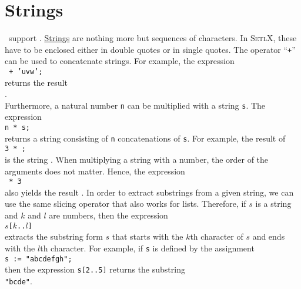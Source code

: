 \section{Strings}
\setlx\ support .  \href{https://en.wikipedia.org/wiki/String_(computer_science)}{Strings} are
nothing more but sequences of characters.  In \textsc{SetlX}, these have to be 
enclosed either in double quotes or in single quotes.  The operator ``\texttt{+}'' can be used to concatenate
strings.  For example, the expression 
\\[0.2cm]
\hspace*{1.3cm}
\texttt{ + \texttt{'uvw'};}
\\[0.2cm]
returns the result
\\[0.2cm]
\hspace*{1.3cm}
.
\\[0.2cm]
Furthermore, a natural number \texttt{n} can be multiplied with a string \texttt{s}.  The expression
\\[0.2cm]
\hspace*{1.3cm}
\texttt{n * s;}
\\[0.2cm]
returns a string consisting of \texttt{n} concatenations of \texttt{s}.  For example,
the result of
\\[0.2cm]
\hspace*{1.3cm}
\texttt{3 * ;}
\\[0.2cm]
is the string .  When multiplying a string with a number, the order of the
arguments does not matter. Hence, the expression
\\[0.2cm]
\hspace*{1.3cm}
\texttt{ * 3}
\\[0.2cm]
also yields the result .  In order to extract substrings from a given string, we can use the same
slicing operator that also works for lists.  Therefore, if $s$ is a string and $k$ and $l$ are numbers, then
the expression 
\\[0.2cm]
\hspace*{1.3cm}
\texttt{$s$[$k$..$l$]}
\\[0.2cm]
extracts the substring form $s$ that starts with the $k$th character of $s$ and ends with the $l$th character.
For example, if \texttt{s} is defined by the assignment
\\[0.2cm]
\hspace*{1.3cm}
\texttt{s := "abcdefgh";}
\\[0.2cm]
then the expression \texttt{s[2..5]} returns the substring
\\[0.2cm]
\hspace*{1.3cm}
\texttt{"bcde"}.


